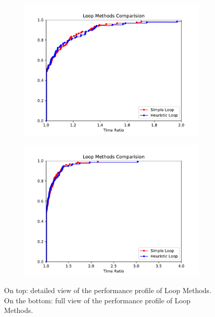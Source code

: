 \begin{figure}[h!]
  \centering
  \begin{subfigure}[b]{0.97\linewidth}
    \includegraphics[width=\linewidth]{media/LoopMethods1.pdf}
  \end{subfigure}
  \begin{subfigure}[b]{0.97\linewidth}
    \includegraphics[width=\linewidth]{media/LoopMethods.pdf}
  \end{subfigure}
  \caption{On top: detailed view of the performance profile of Loop Methods. \\On the bottom: full view of the performance profile of Loop Methods.}
  \label{fig:loops}
\end{figure}


